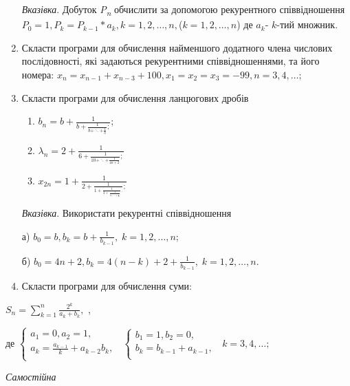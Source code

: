 \documentclass[]{article}
\makeatletter
\newcommand{\xslalph}[1]{\expandafter\@xslalph\csname c@#1\endcsname}
\newcommand{\@xslalph}[1]{%
    \ifcase#1\or а\or б\or в\or г\or д\or e\or є\or ж\or з\or i%
    \or й\or к\or л\or м\or н\or о\or п\or р\or с\or т%
    \or у\or ф\or х\or ц\or ч\or ш\or ю\or я\or аа\or бб\or вв%
    \else\@ctrerr\fi%
}
\makeatother
\begin{document}
\begin{enumerate}
\emph{\emph{Вказівка}}. Добуток \emph{P\textsubscript{n}} обчислити за
допомогою рекурентного співвідношення
\(P_{0} = 1,P_{k} = P_{k - 1}*a_{k},k = 1,2,\ldots,n,\)($k=1,2,\ldots,n$)
де \(a_{k}\)- $k$-тий множник.

\item
  Скласти програми для обчислення найменшого додатного члена числових
  послідовності, які задаються рекурентними співвідношеннями, та його
  номера:
\(x_{n} = x_{n - 1} + x_{n - 3} + 100, x_{1} = x_{2} = x_{3} = - 99, n = 3,4,\ldots;\)

\item
  Скласти програми для обчислення ланцюгових дробів
\begin{enumerate}[label=\xslalph*)]
\item \(b_{n} = b + \frac{1}{b + \frac{1}{b + \ddots + \frac{1}{b}};}\); 
\item
\(\lambda_{n} = 2 + \frac{1}{6 + \frac{1}{10 + \ddots + \frac{1}{4n + 2}};}\)
\item
\(x_{2n} = 1 + \frac{1}{2 + \frac{1}{1 + \frac{1}{2 + \frac{1}{1 + \ddots + \frac{1}{2}}}.};}\)
\end{enumerate}
\emph{\emph{Вказівка}}. Використати рекурентні співвідношення

а)
\(b_{0} = b,b_{k} = b + \frac{1}{b_{k - 1}}, \; k = 1,2,\ldots,n\);

б)
\(b_{0} = 4n + 2,b_{k} = 4(n - k) + 2 + \frac{1}{b_{k - 1}},\; k = 1,2,\ldots,n\).

\item
  Скласти програми для обчислення суми:
\end{enumerate}

\(S_{n} = \sum_{k = 1}^{n}\frac{2^{k}}{a_{k} + b_{k}},\) ,

де \(\left\{ \begin{matrix}
 a_{1} = 0,a_{2} = 1, \\
 a_{k} = \frac{a_{k - 1}}{k} + a_{k - 2}b_{k}, \\
\end{matrix} \right.\ \) \(\left\{ \begin{matrix}
 b_{1} = 1,b_{2} = 0, \\
 b_{k} = b_{k - 1} + a_{k - 1}, \\
\end{matrix} \right.\ \) \(k = 3,4,\ldots;\)



\emph{Самостійна}
\end{document}
